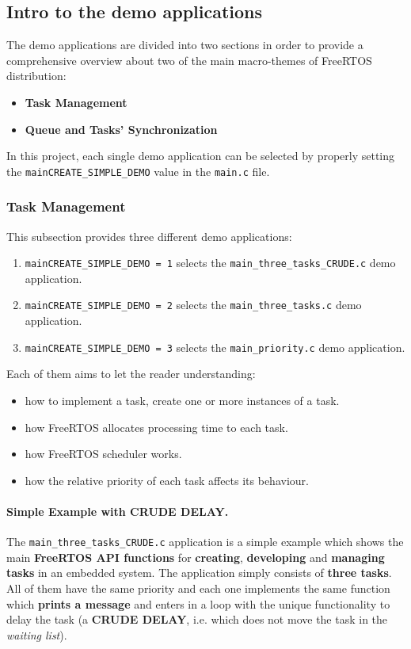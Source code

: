 \subsection{Intro to the demo applications}
The demo applications are divided into two sections in order to provide a comprehensive overview about two of the main macro-themes of FreeRTOS distribution:
\begin{itemize}
    \item \textbf{Task Management}
    \item \textbf{Queue and Tasks' Synchronization}
\end{itemize}
In this project, each single demo application can be selected by properly setting the \texttt{mainCREATE\_SIMPLE\_DEMO} value in the \texttt{main.c} file. 

\subsubsection{Task Management} 
\label{subsubsec: Task Management}
This subsection provides three different demo applications:
\begin{enumerate}
    \item \texttt{mainCREATE\_SIMPLE\_DEMO = 1} selects the \texttt{main\_three\_tasks\_CRUDE.c} demo application.
    \item \texttt{mainCREATE\_SIMPLE\_DEMO = 2} selects the \texttt{main\_three\_tasks.c} demo application.
    \item \texttt{mainCREATE\_SIMPLE\_DEMO = 3} selects the \texttt{main\_priority.c} demo application.
\end{enumerate}
Each of them aims to let the reader understanding:
\begin{itemize}
    \item how to implement a task, create one or more instances of a task.
    \item how FreeRTOS allocates processing time to each task.
    \item how FreeRTOS scheduler works.
    \item how the relative priority of each task affects its behaviour.
\end{itemize}

\paragraph{Simple Example with CRUDE DELAY.}  
\label{par: Simple Example with CRUDE DELAY}
The \texttt{main\_three\_tasks\_CRUDE.c} application is a simple example which shows the main \textbf{FreeRTOS API functions} for \textbf{creating}, \textbf{developing} and \textbf{managing tasks} in an embedded system.
The application simply consists of \textbf{three tasks}. All of them have the same priority and each one implements the same function which \textbf{prints a message} and enters in a loop with the unique functionality to delay the task (a \textbf{CRUDE DELAY}, i.e. which does not move the task in the \textit{waiting list}).

